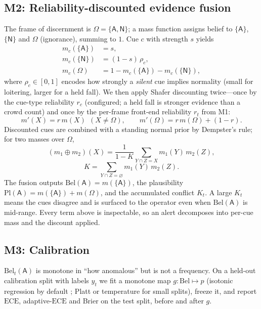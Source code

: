 \documentclass[conference]{IEEEtran}
\newcommand{\Rel}{r}                 %
\newcommand{\bel}{\mathrm{Bel}}
\newcommand{\pl}{\mathrm{Pl}}
\newcommand{\me}{m}                  %
\renewcommand{\Theta}{\Omega}       %
\newcommand{\Anom}{\textsf{A}}       %
\newcommand{\Norm}{\textsf{N}}       %
\newcommand{\ece}{\mathrm{ECE}}
\begin{document}
\subsection{M2: Reliability-discounted evidence fusion}
\label{sec:m2}
The frame of discernment is $\Theta=\{\Anom,\Norm\}$; a mass function assigns
belief to $\{\Anom\}$, $\{\Norm\}$ and $\Theta$ (ignorance), summing to $1$.
Cue $c$ with strength $s$ yields
\begin{align}
\me_c(\{\Anom\}) &= s, \\
\me_c(\{\Norm\}) &= (1-s)\,\rho_c, \\
\me_c(\Theta) &= 1-\me_c(\{\Anom\})-\me_c(\{\Norm\}),
\end{align}
where $\rho_c\in[0,1]$ encodes how strongly a \emph{silent} cue implies
normality (small for loitering, larger for a held fall). We then apply
Shafer discounting twice---once by the cue-type reliability $\Rel_c$
(configured; a held fall is stronger evidence than a crowd count) and once by
the per-frame front-end reliability $\Rel_t$ from M1:
\begin{equation}
\me'(X)=\Rel\,\me(X)\ \ (X\neq\Theta),\qquad
\me'(\Theta)=\Rel\,\me(\Theta)+(1-\Rel).
\end{equation}
Discounted cues are combined with a standing normal prior by Dempster's rule;
for two masses over $\Theta$,
\begin{equation}
(\me_1\!\oplus\!\me_2)(X)=\frac{1}{1-K}\sum_{Y\cap Z=X}\me_1(Y)\,\me_2(Z),
\end{equation}
\begin{equation}
K=\sum_{Y\cap Z=\varnothing}\me_1(Y)\,\me_2(Z).
\end{equation}
The fusion outputs $\bel(\Anom)=\me(\{\Anom\})$, the plausibility
$\pl(\Anom)=\me(\{\Anom\})+\me(\Theta)$, and the accumulated conflict $K_t$.
A large $K_t$ means the cues disagree and is surfaced to the operator even
when $\bel(\Anom)$ is mid-range. Every term above is inspectable, so an alert
decomposes into per-cue mass and the discount applied.

\subsection{M3: Calibration}
\label{sec:m3}
$\bel_t(\Anom)$ is monotone in ``how anomalous'' but is not a frequency. On a
held-out calibration split with labels $y_t$ we fit a monotone map
$g:\!\bel\mapsto p$ (isotonic regression by default \cite{zadrozny2002isotonic};
Platt \cite{platt1999} or temperature \cite{guo2017calibration} for small
splits), freeze it, and report $\ece$, adaptive-$\ece$ and Brier on the test
split, before and after $g$.
\end{document}
